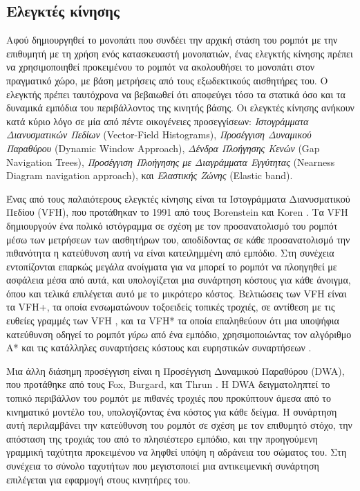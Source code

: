 \subsection{Ελεγκτές κίνησης}
\label{subsection:02_01_02:02}

Αφού δημιουργηθεί το μονοπάτι που συνδέει την αρχική στάση του ρομπότ με την
επιθυμητή με τη χρήση ενός κατασκευαστή μονοπατιών, ένας ελεγκτής κίνησης
πρέπει να χρησιμοποιηθεί προκειμένου το ρομπότ να ακολουθήσει το μονοπάτι στον
πραγματικό χώρο, με βάση μετρήσεις από τους εξωδεκτικούς αισθητήρες του. Ο
ελεγκτής πρέπει ταυτόχρονα να βεβαιωθεί ότι αποφεύγει τόσο τα στατικά όσο και
τα δυναμικά εμπόδια του περιβάλλοντος της κινητής βάσης. Οι ελεγκτές κίνησης
ανήκουν κατά κύριο λόγο σε μία από πέντε οικογένειες προσεγγίσεων:
\textit{Ιστογράμματα Διανυσματικών Πεδίων} (Vector-Field Histograms),
\textit{Προσέγγιση Δυναμικού Παραθύρου} (Dynamic Window Approach),
\textit{Δένδρα Πλοήγησης Κενών} (Gap Navigation Trees), \textit{Προσέγγιση
Πλοήγησης με Διαγράμματα Εγγύτητας} (Nearness Diagram navigation approach), και
\textit{Ελαστικής Ζώνης} (Elastic band).

Ένας από τους παλαιότερους ελεγκτές κίνησης είναι τα Ιστογράμματα Διανυσματικού
Πεδίου (VFH), που προτάθηκαν το 1991 από τους Borenstein και Koren
\cite{Borenstein1991}. Τα VFH δημιουργούν ένα πολικό ιστόγραμμα σε σχέση με τον
προσανατολισμό του ρομπότ μέσω των μετρήσεων των αισθητήρων του, αποδίδοντας σε
κάθε προσανατολισμό την πιθανότητα η κατεύθυνση αυτή να είναι κατειλημμένη από
εμπόδιο. Στη συνέχεια εντοπίζονται επαρκώς μεγάλα ανοίγματα για να μπορεί το
ρομπότ να πλοηγηθεί με ασφάλεια μέσα από αυτά, και υπολογίζεται μια συνάρτηση
κόστους για κάθε άνοιγμα, όπου και τελικά επιλέγεται αυτό με το μικρότερο
κόστος.  Βελτιώσεις των VFH είναι τα VFH+, τα οποία ενσωματώνουν τοξοειδείς
τοπικές τροχιές, σε αντίθεση με τις ευθείες γραμμές των VFH \cite{Ulrich}, και
τα VFH* τα οποία επαληθεύουν ότι μια υποψήφια κατεύθυνση οδηγεί το ρομπότ
\textit{γύρω} από ένα εμπόδιο, χρησιμοποιώντας τον αλγόριθμο A* και τις
κατάλληλες συναρτήσεις κόστους και ευρηστικών συναρτήσεων \cite{Ulricha}.

Μια άλλη διάσημη προσέγγιση είναι η Προσέγγιση Δυναμικού Παραθύρου (DWA), που
προτάθηκε από τους Fox, Burgard, και Thrun \cite{Fox1997}. Η DWA δειγματοληπτεί
το τοπικό περιβάλλον του ρομπότ με πιθανές τροχιές που προκύπτουν άμεσα από το
κινηματικό μοντέλο του, υπολογίζοντας ένα κόστος για κάθε δείγμα. Η συνάρτηση
αυτή περιλαμβάνει την κατεύθυνση του ρομπότ σε σχέση με τον επιθυμητό στόχο,
την απόσταση της τροχιάς του από το πλησιέστερο εμπόδιο, και την προηγούμενη
γραμμική ταχύτητα προκειμένου να ληφθεί υπόψη η αδράνεια του σώματος του. Στη
συνέχεια το σύνολο ταχυτήτων που μεγιστοποιεί μια αντικειμενική συνάρτηση
επιλέγεται για εφαρμογή στους κινητήρες του.

